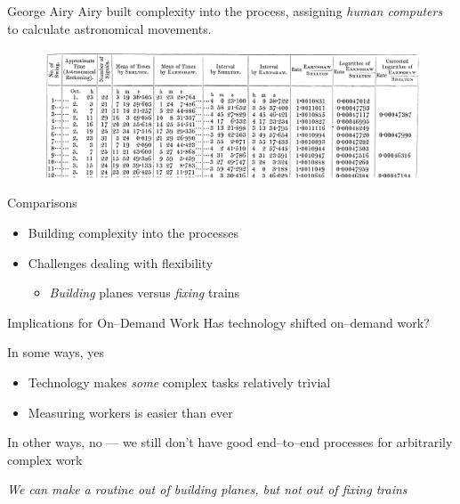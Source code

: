\documentclass[presentation]{subfiles}
\begin{document}
\begin{frame}{George Airy}
    Airy built complexity into the process, assigning \emph{human computers} 
    to calculate astronomical movements.

    \begin{figure}
    \includegraphics[width=\textwidth]{figures/complexity/pw_literature/airy.png}
    \end{figure}
\end{frame}






\begin{frame}{Comparisons}

\begin{itemize}
    \item<+-> Building complexity into the processes
  \item Challenges dealing with flexibility
  \begin{itemize}
    \item \emph{Building} planes versus \emph{fixing} trains
  \end{itemize}
\end{itemize}
\end{frame}

\begin{frame}{Implications for On--Demand Work}
  Has technology shifted on--demand work?
    
  In some ways, yes
        \begin{itemize}
          \item Technology makes \emph{some} complex tasks relatively trivial
          \item Measuring workers is easier than ever
        \end{itemize}
  In other ways, no --- we still don't have good end--to--end processes for arbitrarily complex work

  \emph{We can make a routine out of building planes, but not out of fixing trains}
\end{frame}
\end{document}
